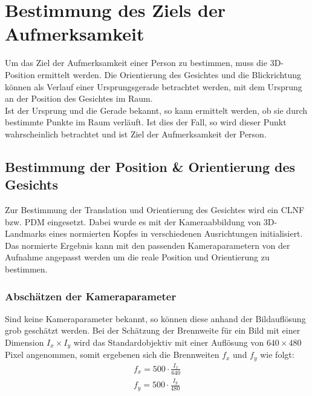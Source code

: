 \section{Bestimmung des Ziels der Aufmerksamkeit}
\label{calc_Position}
Um das Ziel der Aufmerksamkeit einer Person zu bestimmen, muss die 3D-Position ermittelt werden. Die Orientierung des Gesichtes und die Blickrichtung können als Verlauf einer Ursprungsgerade betrachtet werden, mit dem Ursprung an der Position des Gesichtes im Raum.\\
Ist der Ursprung und die Gerade bekannt, so kann ermittelt werden, ob sie durch bestimmte Punkte im Raum verläuft. Ist dies der Fall, so wird dieser Punkt wahrscheinlich betrachtet und ist Ziel der Aufmerksamkeit der Person.
\subsection{Bestimmung der Position \& Orientierung des Gesichts}
Zur Bestimmung der Translation und Orientierung des Gesichtes wird ein CLNF bzw. PDM eingesetzt. Dabei wurde es mit der Kameraabbildung von 3D-Landmarks eines normierten Kopfes in verschiedenen Ausrichtungen initialisiert. Das normierte Ergebnis kann mit den passenden Kameraparametern von der Aufnahme angepasst werden um die reale Position und Orientierung zu bestimmen.
\subsubsection{Abschätzen der Kameraparameter}
Sind keine Kameraparameter bekannt, so können diese anhand der Bildauflösung grob geschätzt werden. Bei der Schätzung der Brennweite für ein Bild mit einer Dimension $I_x\times I_y$ wird das Standardobjektiv mit einer Auflösung von $640 \times 480$ Pixel angenommen, somit ergebenen sich die Brennweiten $f_x$ und $f_y$ wie folgt:\cite{OpenFace}
\begin{align*}
f_x = 500\cdot \frac{I_x}{640}\\
f_y = 500\cdot \frac{I_y}{480}
\end{align*}
